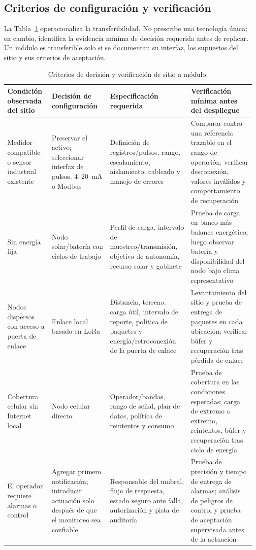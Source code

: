 \documentclass[conference]{IEEEtran}
\begin{document}
\subsection{Criterios de configuración y verificación}

La Tabla~\ref{tab:criteria} operacionaliza la transferibilidad. No prescribe una tecnología única; en cambio, identifica la evidencia mínima de decisión requerida antes de replicar. Un módulo es transferible solo si se documentan su interfaz, los supuestos del sitio y sus criterios de aceptación.

\begin{table}[t]
\caption{Criterios de decisión y verificación de sitio a módulo.}
\label{tab:criteria}
\centering
\scriptsize
\renewcommand{\arraystretch}{1.12}
\begin{tabularx}{\textwidth}{@{}>{\raggedright\arraybackslash}p{}>{\raggedright\arraybackslash}p{}>{\raggedright\arraybackslash}X>{\raggedright\arraybackslash}X@{}}
\toprule
\textbf{Condición observada del sitio} & \textbf{Decisión de configuración} & \textbf{Especificación requerida} & \textbf{Verificación mínima antes del despliegue} \\
\midrule
Medidor compatible o sensor industrial existente & Preservar el activo; seleccionar interfaz de pulsos, 4--20~mA o Modbus & Definición de registros/pulsos, rango, escalamiento, aislamiento, cableado y manejo de errores & Comparar contra una referencia trazable en el rango de operación; verificar desconexión, valores inválidos y comportamiento de recuperación \\
Sin energía fija & Nodo solar/batería con ciclos de trabajo & Perfil de carga, intervalo de muestreo/transmisión, objetivo de autonomía, recurso solar y gabinete & Prueba de carga en banco más balance energético; luego observar batería y disponibilidad del nodo bajo clima representativo \\
Nodos dispersos con acceso a puerta de enlace & Enlace local basado en LoRa & Distancia, terreno, carga útil, intervalo de reporte, política de paquetes y energía/retroconexión de la puerta de enlace & Levantamiento del sitio y prueba de entrega de paquetes en cada ubicación; verificar búfer y recuperación tras pérdida de enlace \\
Cobertura celular sin Internet local & Nodo celular directo & Operador/bandas, rango de señal, plan de datos, política de reintentos y consumo & Prueba de cobertura en las condiciones esperadas; carga de extremo a extremo, reintentos, búfer y recuperación tras ciclo de energía \\
El operador requiere alarmas o control & Agregar primero notificación; introducir actuación solo después de que el monitoreo sea confiable & Responsable del umbral, flujo de respuesta, estado seguro ante falla, autorización y pista de auditoría & Prueba de precisión y tiempo de entrega de alarmas; análisis de peligros de control y prueba de aceptación supervisada antes de la actuación \\
\bottomrule
\end{tabularx}
\end{table}
\end{document}
